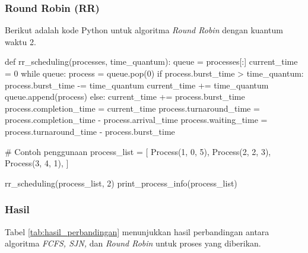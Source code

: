 \documentclass[12pt]{article}
\begin{document}
\subsubsection{Round Robin (RR)}
Berikut adalah kode Python untuk algoritma \textit{Round Robin} dengan kuantum waktu 2.

\begin{python}[caption=Kode Python untuk penjadwalan \textit{Round Robin (RR)}]
def rr_scheduling(processes, time_quantum):
    queue = processes[:]
    current_time = 0
    while queue:
        process = queue.pop(0)
        if process.burst_time > time_quantum:
            process.burst_time -= time_quantum
            current_time += time_quantum
            queue.append(process)
        else:
            current_time += process.burst_time
            process.completion_time = current_time
            process.turnaround_time = process.completion_time - process.arrival_time
            process.waiting_time = process.turnaround_time - process.burst_time

# Contoh penggunaan
process_list = [
    Process(1, 0, 5),
    Process(2, 2, 3),
    Process(3, 4, 1),
]

rr_scheduling(process_list, 2)
print_process_info(process_list)
\end{python}

\subsubsection{Hasil}
Tabel \ref{tab:hasil_perbandingan} menunjukkan hasil perbandingan antara algoritma \textit{FCFS, SJN,} dan \textit{Round Robin} untuk proses yang diberikan.
\end{document}
